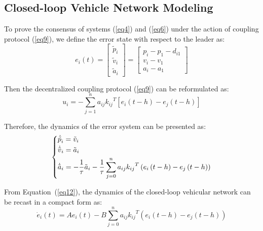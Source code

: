 \documentclass[a4paper]{cas-sc}
\begin{document}
\subsection{Closed-loop Vehicle Network Modeling}
\label{Section 3.2}

To prove the consensus of systems (\ref{eq4}) and (\ref{eq6}) under the action of coupling protocol (\ref{eq9}), we define the error state with respect to the leader as:
\begin{equation}
  {e_i}\left( t \right) = \left[ {\begin{array}{*{20}{c}}
          {{{\tilde p}_i}} \\
          {{{\tilde v}_i}} \\
          {{{\tilde a}_i}}
        \end{array}} \right] = \left[ {\begin{array}{*{20}{c}}
          {{p_i} - {p_1} - {d_{i1}}} \\
          {{v_i} - {v_1}}            \\
          {{a_i} - {a_1}}
        \end{array}} \right]
  \label{eq10}
\end{equation}

Then the decentralized coupling protocol (\ref{eq9}) can be reformulated as:
\begin{equation}
  {u_i} =  - \sum\limits_{j = 1}^n {{a_{ij}}{k_{ij}}^T\left[ {{e_i}(t - h) - {e_j}(t - h)} \right]}
  \label{eq11}
\end{equation}

Therefore, the dynamics of the error system can be presented as:
\begin{equation}
  \left\{ \begin{gathered}
    {{\dot {\tilde p}}_i} = {{\tilde v}_i} \hfill \\
    {{\dot {\tilde v}}_i} = {{\tilde a}_i} \hfill \\
    {{\dot {\tilde a}}_i} =  - \frac{1}{\tau }{{\tilde a}_i} - \frac{1}{\tau }\sum\limits_{j = 0}^n {{a_{ij}}{k_{ij}}^T\left( {{e_i}\left( {t - h} \right) - {e_j}\left( {t - h} \right)} \right)}  \hfill \\
  \end{gathered}  \right.
  \label{eq12}
\end{equation}

From Equation~(\ref{eq12}), the dynamics of the closed-loop vehicular network can be recast in a compact form as:
\begin{equation}
  {\dot e_i}\left( t \right) = A{e_i}\left( t \right) - B\sum\limits_{j = 0}^n {{a_{ij}}{k_{ij}}^T\left( {{e_i}\left( {t - h} \right) - {e_j}\left( {t - h} \right)} \right)}
  \label{eq13}
\end{equation}
\end{document}
